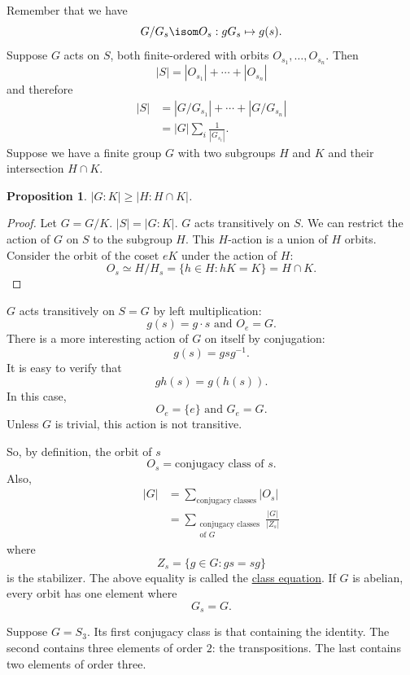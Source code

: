 \documentclass[11pt, oneside]{amsart}
\numberwithin{equation}{section}
\numberwithin{theorem}{section}
\newtheorem{proposition}[theorem]{Proposition}
\theoremstyle{definition}
\begin{document}
{Remember that we have 
$$
G/G_s \isom O_s : gG_s \mapsto g(s).
$$
Suppose $G$ acts on $S$, both finite-ordered with orbits $O_{s_1},\hdots,O_{s_n}$. Then 
$$
|S| = |O_{s_1}| + \cdots + |O_{s_n}|
$$
and therefore
\begin{align*}
|S| 	&= |G/G_{s_1}| + \cdots + |G/G_{s_n}|\\
	&= |G| \sum_i \frac{1}{|G_{s_i}|}.
\end{align*}
Suppose we have a finite group $G$ with two subgroups $H$ and $K$ and their intersection $H\cap K$. 
\begin{proposition}
$|G :K| \geqslant |H : H\cap K|$.
\end{proposition}
\begin{proof}
Let $G=G/K$. $|S| = |G:K|$. $G$ acts transitively on $S$. We can restrict the action of $G$ on $S$ to the subgroup $H$. This $H$-action is a union of $H$ orbits. Consider the orbit of the coset $eK$ under the action of $H$:  
$$
O_s \simeq H/H_s = \{h\in H : hK=K\} = H\cap K.
$$
\end{proof}
$G$ acts transitively on $S=G$ by left multiplication:
$$
g(s) = g\cdot s\textrm{ and } O_e = G.
$$
There is a more interesting action of $G$ on itself by conjugation:
$$
g(s) = gsg^{-1}.
$$
It is easy to verify that 
$$
gh(s) = g(h(s)).
$$
In this case, 
$$
O_e = \{e\} \textrm{ and } G_e = G.
$$
Unless $G$ is trivial, this action is not transitive.

So, by definition, the orbit of $s$
$$
O_s = \textrm{conjugacy class of } s.
$$
Also, 
\begin{align*}
|G| 	&= \sum_{\textrm{conjugacy classes}} |O_s|\\
	&= \sum_{\substack{\textrm{conjugacy classes}\\\textrm{of } G}} \frac{|G|}{|Z_s|}
\end{align*}
where 
$$
Z_s = \{g\in G : gs = sg\}
$$
is the stabilizer. 
The above equality is called the \underline{class equation}. If $G$ is abelian, every orbit has one element where 
$$
G_s = G.
$$

Suppose $G=S_3$. Its first conjugacy class is that containing the identity. The second contains three elements of order $2$: the transpositions. The last contains two elements of order three.

}
\end{document}
